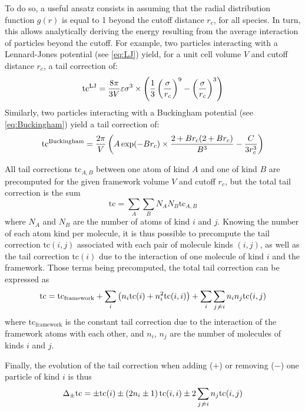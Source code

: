 \documentclass[main.tex]{subfiles}
\begin{document}
To do so, a useful ansatz consists in assuming that the radial distribution function $g(r)$ is equal to 1 beyond the cutoff distance $r_c$, for all species. In turn, this allows analytically deriving the energy resulting from the average interaction of particles beyond the cutoff. For example, two particles interacting with a Lennard-Jones potential (see \cref{eq:LJ}) yield, for a unit cell volume $V$ and cutoff distance $r_c$, a tail correction of:
\[\text{tc}^\text{LJ} = \frac{8\pi}{3V}\varepsilon\sigma^3\times\left(\frac13\left(\frac{\sigma}{r_c}\right)^9 - \left(\frac{\sigma}{r_c}\right)^3\right)\]
Similarly, two particles interacting with a Buckingham potential (see \cref{eq:Buckingham}) yield a tail correction of:
\[\text{tc}^\text{Buckingham} = \frac{2\pi}V \left(A\exp(-Br_c)\times\frac{2 + Br_c(2 + Br_c)}{B^3} - \frac C{3r_c^3}\right)\]

All tail corrections $\text{tc}_{A,B}$ between one atom of kind $A$ and one of kind $B$ are precomputed for the given framework volume $V$ and cutoff $r_c$, but the total tail correction is the sum
\[\text{tc} = \sum_A\sum_B N_AN_B\text{tc}_{A,B}\]
where $N_A$ and $N_B$ are the number of atoms of kind $i$ and $j$. Knowing the number of each atom kind per molecule, it is thus possible to precompute the tail correction $\text{tc}(i,j)$ associated with each pair of molecule kinds $(i,j)$, as well as the tail correction $\text{tc}(i)$ due to the interaction of one molecule of kind $i$ and the framework. Those terms being precomputed, the total tail correction can be expressed as
\[\text{tc} = \text{tc}_\text{framework} + \sum_i \left(n_i\text{tc}(i) + n_i^2\text{tc}(i,i)\right) + \sum_i\sum_{j\not\kern0.2ex= i} n_in_j\text{tc}(i,j)\]
where $\text{tc}_\text{framework}$ is the constant tail correction due to the interaction of the framework atoms with each other, and $n_i$, $n_j$ are the number of molecules of kinds $i$ and $j$.

Finally, the evolution of the tail correction when adding ($+$) or removing ($-$) one particle of kind $i$ is thus
\[\Delta_{\pm}\text{tc} = \pm\text{tc}(i) \pm\left(2n_i\pm1\right)\text{tc}(i,i) \pm 2\sum_{j\not\kern0.2ex= i} n_j\text{tc}(i,j)\]
\end{document}
